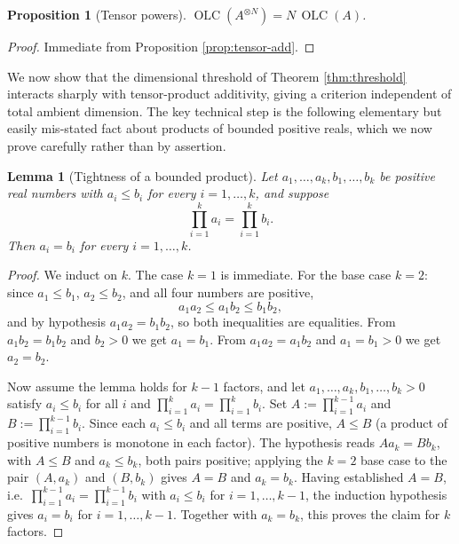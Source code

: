 \documentclass{article}
\newtheorem{proposition}[theorem]{Proposition}
\newtheorem{lemma}[theorem]{Lemma}
\theoremstyle{remark}
\providecommand{\QLC}{\operatorname{OLC}}
\begin{document}
\begin{proposition}[Tensor powers]
$\QLC(A^{\otimes N})=N\,\QLC(A)$.
\end{proposition}
\begin{proof}
Immediate from Proposition \ref{prop:tensor-add}.
\end{proof}

We now show that the dimensional threshold of Theorem \ref{thm:threshold} interacts sharply with tensor-product additivity, giving a criterion independent of total ambient dimension. The key technical step is the following elementary but easily mis-stated fact about products of bounded positive reals, which we now prove carefully rather than by assertion.

\begin{lemma}[Tightness of a bounded product]\label{lem:tight-product}
Let $a_1,\dots,a_k,b_1,\dots,b_k$ be positive real numbers with $a_i\le b_i$ for every $i=1,\dots,k$, and suppose
\[
\prod_{i=1}^k a_i = \prod_{i=1}^k b_i.
\]
Then $a_i=b_i$ for every $i=1,\dots,k$.
\end{lemma}
\begin{proof}
We induct on $k$. The case $k=1$ is immediate. For the base case $k=2$: since $a_1\le b_1$, $a_2\le b_2$, and all four numbers are positive,
\[
a_1a_2 \le a_1b_2 \le b_1b_2,
\]
and by hypothesis $a_1a_2=b_1b_2$, so both inequalities are equalities. From $a_1b_2=b_1b_2$ and $b_2>0$ we get $a_1=b_1$. From $a_1a_2=a_1b_2$ and $a_1=b_1>0$ we get $a_2=b_2$.

Now assume the lemma holds for $k-1$ factors, and let $a_1,\dots,a_k,b_1,\dots,b_k>0$ satisfy $a_i\le b_i$ for all $i$ and $\prod_{i=1}^k a_i=\prod_{i=1}^k b_i$. Set $A:=\prod_{i=1}^{k-1}a_i$ and $B:=\prod_{i=1}^{k-1}b_i$. Since each $a_i\le b_i$ and all terms are positive, $A\le B$ (a product of positive numbers is monotone in each factor). The hypothesis reads $Aa_k=Bb_k$, with $A\le B$ and $a_k\le b_k$, both pairs positive; applying the $k=2$ base case to the pair $(A,a_k)$ and $(B,b_k)$ gives $A=B$ and $a_k=b_k$. Having established $A=B$, i.e.\ $\prod_{i=1}^{k-1}a_i=\prod_{i=1}^{k-1}b_i$ with $a_i\le b_i$ for $i=1,\dots,k-1$, the induction hypothesis gives $a_i=b_i$ for $i=1,\dots,k-1$. Together with $a_k=b_k$, this proves the claim for $k$ factors.
\end{proof}
\end{document}
